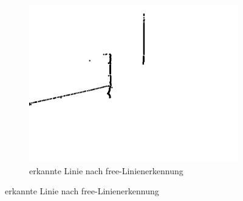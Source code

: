 \documentclass[ngerman,a4paper,parskip=half]{scrartcl}
\begin{document}
\begin{figure}[H]
\begin{subfigure}{0.32\textwidth}
		\includegraphics[width=\textwidth]{includes/red_0_free.png}
		\caption{erkannte Linie nach free-Linienerkennung}
		\label{fig:red_0_free}
	\end{subfigure}
	

\end{figure}
\end{document}
